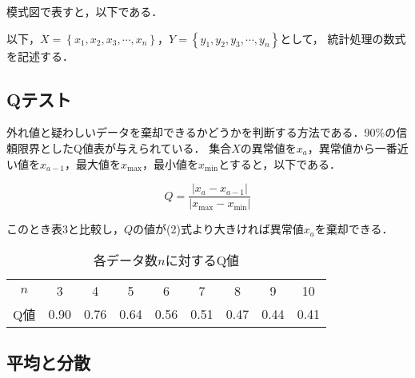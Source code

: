 \documentclass[a4paper,11pt]{ltjsarticle}
\begin{document}
模式図で表すと，以下である．

\begin{figure}[h]
    \centering
\end{figure}

以下，$X = \left\{x_1, x_2, x_3, \cdots, x_n\right\}$，$Y = \left\{y_1, y_2, y_3, \cdots, y_n\right\}$として，
統計処理の数式を記述する．

\subsection{Qテスト}

外れ値と疑わしいデータを棄却できるかどうかを判断する方法である．90\%の信頼限界としたQ値表が与えられている．
集合$X$の異常値を$x_a$，異常値から一番近い値を$x_{a-1}$，最大値を$x_{\mathrm{max}}$，最小値を$x_{\mathrm{min}}$とすると，以下である．

\begin{equation}
    Q = \dfrac{|x_a - x_{a-1}|}{|x_{\mathrm{max}} - x_{\mathrm{min}}|}
\end{equation}

このとき表3と比較し，$Q$の値が(2)式より大きければ異常値$x_a$を棄却できる．

\begin{table}[h]
    \centering
    \caption{各データ数$n$に対するQ値}
    \begin{tabular}{ccccccccc}
        \hline
        $n$ & 3 & 4 & 5 & 6 & 7 & 8 & 9 & 10 \\
        Q値 & 0.90 & 0.76 & 0.64 & 0.56 & 0.51 & 0.47 & 0.44 & 0.41 \\
        \hline
    \end{tabular}
\end{table}

\subsection{平均と分散}
\end{document}
